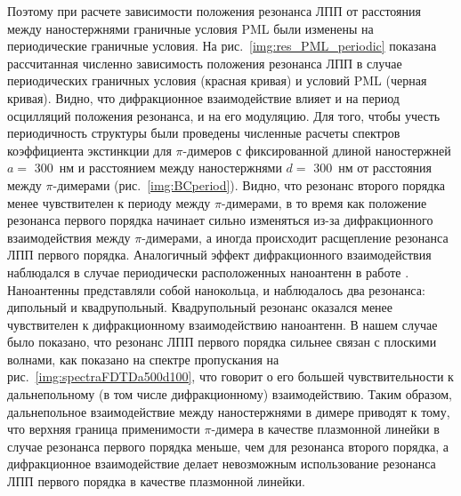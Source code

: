 Поэтому при расчете зависимости положения резонанса ЛПП от расстояния между наностержнями граничные условия PML были изменены на периодические граничные условия. На рис.~\ref{img:res_PML_periodic} показана рассчитанная численно зависимость положения резонанса ЛПП в случае периодических граничных условия (красная кривая) и условий PML (черная кривая). Видно, что дифракционное взаимодействие влияет и на период осцилляций положения резонанса, и на его модуляцию.
Для того, чтобы учесть периодичность структуры были проведены численные расчеты спектров коэффициента экстинкции для $ \pi $-димеров с фиксированной длиной наностержней $ a = $ 300~нм и расстоянием между наностержнями $ d = $ 300~нм от расстояния между $ \pi $-димерами (рис.~\ref{img:BCperiod}). Видно, что резонанс второго порядка менее чувствителен к периоду между $ \pi $-димерами, в то время как положение резонанса первого порядка начинает сильно изменяться из-за дифракционного взаимодействия между $ \pi $-димерами, а иногда происходит расщепление резонанса ЛПП первого порядка. Аналогичный эффект дифракционного взаимодействия наблюдался в случае периодически расположенных наноантенн в работе \cite{diffractionCoupling}. Наноантенны представляли собой нанокольца, и наблюдалось два резонанса: дипольный и квадрупольный. Квадрупольный резонанс оказался менее чувствителен к дифракционному взаимодействию наноантенн. В нашем случае было показано, что резонанс ЛПП первого порядка сильнее связан с плоскими волнами, как показано на спектре пропускания на рис.~\ref{img:spectraFDTDa500d100}, что говорит о его большей чувствительности к дальнепольному (в том числе дифракционному) взаимодействию.
Таким образом, дальнепольное взаимодействие между наностержнями в димере приводят к тому, что верхняя граница применимости $ \pi $-димера в качестве плазмонной линейки в случае резонанса первого порядка меньше, чем для резонанса второго порядка, а дифракционное взаимодействие делает невозможным использование резонанса ЛПП первого порядка в качестве плазмонной линейки.